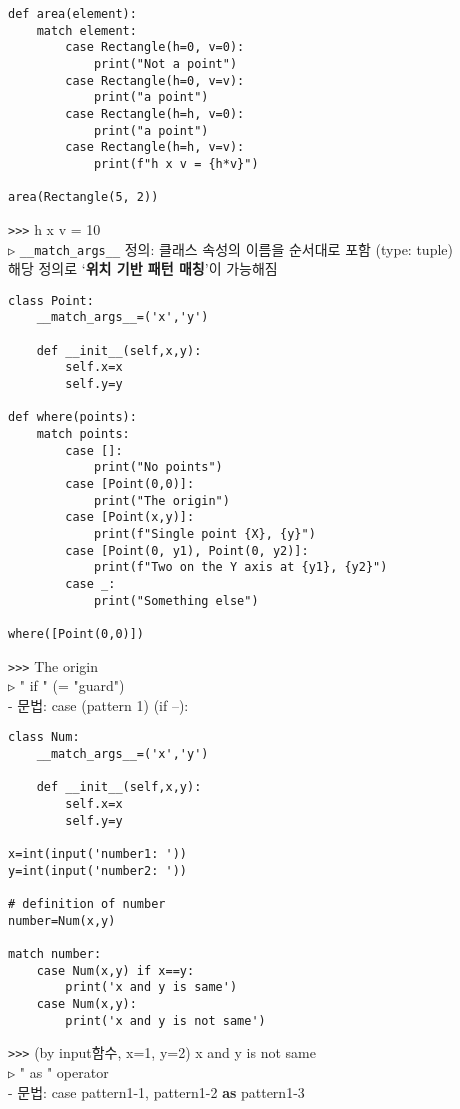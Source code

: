 \documentclass[11pt,a4paper]{article}
\begin{document}
\begin{spacing}{1.5}
\begin{lstlisting}[label={list:first}]
def area(element):
    match element:
        case Rectangle(h=0, v=0):
            print("Not a point")
        case Rectangle(h=0, v=v):
            print("a point")
        case Rectangle(h=h, v=0):
            print("a point")
        case Rectangle(h=h, v=v):
            print(f"h x v = {h*v}")

area(Rectangle(5, 2))
\end{lstlisting}
\verb|>>>| h x v = 10\\

\texttt{▷} \verb|__match_args__| 정의: 클래스 속성의 이름을 순서대로 포함 (type: tuple)\\
\hspace*{1em}해당 정의로 `\textbf{위치 기반 패턴 매칭}'이 가능해짐
\begin{lstlisting}[label={list:first}]
class Point:
    __match_args__=('x','y')

    def __init__(self,x,y):
        self.x=x
        self.y=y

def where(points):
    match points:
        case []:
            print("No points")
        case [Point(0,0)]:
            print("The origin")
        case [Point(x,y)]:
            print(f"Single point {X}, {y}")
        case [Point(0, y1), Point(0, y2)]:
            print(f"Two on the Y axis at {y1}, {y2}")
        case _:
            print("Something else")

where([Point(0,0)])
\end{lstlisting}
\verb|>>>| The origin\\

\texttt{▷} " if " (= "guard")\\
- 문법: case (pattern 1) (if --):
\begin{lstlisting}[label={list:first}]
class Num:
    __match_args__=('x','y')

    def __init__(self,x,y):
        self.x=x
        self.y=y

x=int(input('number1: '))
y=int(input('number2: '))

# definition of number
number=Num(x,y)

match number:
    case Num(x,y) if x==y:
        print('x and y is same')
    case Num(x,y):
        print('x and y is not same')
\end{lstlisting}
\verb|>>>| (by input함수,   x=1,  y=2) x  and  y  is  not  same\\

\texttt{▷} " as " operator\\
- 문법:  case   pattern1-1,   pattern1-2   \textbf{as}   pattern1-3\\


\end{spacing}
\end{document}
